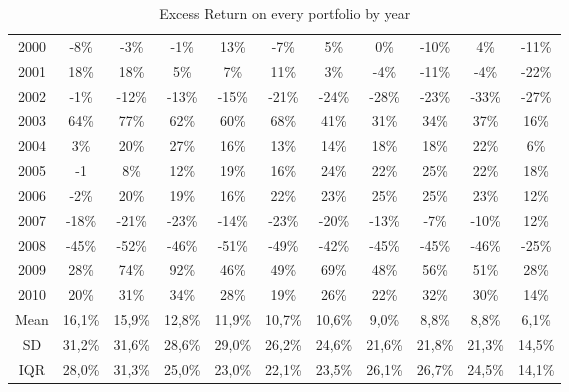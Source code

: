 \documentclass[11pt]{article}
\begin{document}
\begin{table}[H]
\begin{tabular}{ccccccccccc}
    2000 & -8\% & -3\% & -1\% & 13\% & -7\% & 5\% & 0\% & -10\% & 4\% & -11\% \\
    2001 & 18\% & 18\% & 5\% & 7\% & 11\% & 3\% & -4\% & -11\% & -4\% & -22\% \\
    \rowcolor{myred} 2002 & -1\% & -12\% & -13\% & -15\% & -21\% & -24\% & -28\% & -23\% & -33\% & -27\% \\
    \rowcolor{myblue} 2003 & 64\% & 77\% & 62\% & 60\% & 68\% & 41\% & 31\% & 34\% & 37\% & 16\% \\
    2004 & 3\% & 20\% & 27\% & 16\% & 13\% & 14\% & 18\% & 18\% & 22\% & 6\% \\
    2005 & -1 & 8\% & 12\% & 19\% & 16\% & 24\% & 22\% & 25\% & 22\% & 18\% \\
    2006 & -2\% & 20\% & 19\% & 16\% & 22\% & 23\% & 25\% & 25\% & 23\% & 12\% \\
    2007 & -18\% & -21\% & -23\% & -14\% & -23\% & -20\% & -13\% & -7\% & -10\% & 12\% \\
    \rowcolor{myred} 2008 & -45\% & -52\% & -46\% & -51\% & -49\% & -42\% & -45\% & -45\% & -46\% & -25\% \\
    \rowcolor{myblue} 2009 & 28\% & 74\% & 92\% & 46\% & 49\% & 69\% & 48\% & 56\% & 51\% & 28\% \\
    2010 & 20\% & 31\% & 34\% & 28\% & 19\% & 26\% & 22\% & 32\% & 30\% & 14\% \\
    \midrule
    \midrule
    Mean & 16,1\% & 15,9\% & 12,8\% & 11,9\% & 10,7\% & 10,6\% & 9,0\% & 8,8\% & 8,8\% & 6,1\% \\
    SD & 31,2\% & 31,6\% & 28,6\% & 29,0\% & 26,2\% & 24,6\% & 21,6\% & 21,8\% & 21,3\% & 14,5\% \\
    IQR & 28,0\% & 31,3\% & 25,0\% & 23,0\% & 22,1\% & 23,5\% & 26,1\% & 26,7\% & 24,5\% & 14,1\% \\
    \bottomrule
    \bottomrule
    \end{tabular}
    \caption{Excess Return on every portfolio by year} 
    \label{tab:month_year_er}
\end{table}
\end{document}
